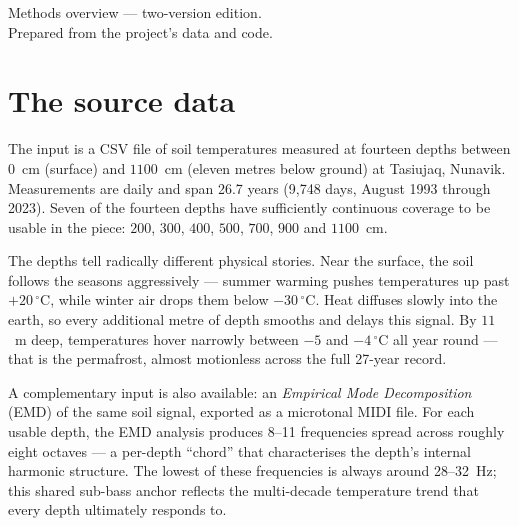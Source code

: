 \documentclass[11pt, a4paper]{article}
\begin{document}
\vfill
\begin{flushleft}
  {\sffamily\footnotesize\color{footergray}
  Methods overview --- two-version edition.\\
  Prepared from the project's data and code.}
\end{flushleft}

\clearpage

\thispagestyle{cover}
\vspace*{1em}
\renewcommand{\contentsname}{Contents}
\tableofcontents
\vfill
\clearpage

\setcounter{page}{1}

\section{The source data}

The input is a CSV file of soil temperatures measured at fourteen depths
between $0$~cm (surface) and $1100$~cm (eleven metres below ground) at
Tasiujaq, Nunavik. Measurements are daily and span 26.7 years (9{,}748 days,
August 1993 through 2023). Seven of the fourteen depths have sufficiently
continuous coverage to be usable in the piece: $200$, $300$, $400$, $500$,
$700$, $900$ and $1100$~cm.

The depths tell radically different physical stories. Near the surface, the
soil follows the seasons aggressively --- summer warming pushes temperatures
up past $+20\,^{\circ}\mathrm{C}$, while winter air drops them below
$-30\,^{\circ}\mathrm{C}$. Heat diffuses slowly into the earth, so every
additional metre of depth smooths and delays this signal. By $11$~m deep,
temperatures hover narrowly between $-5$ and $-4\,^{\circ}\mathrm{C}$ all
year round --- that is the permafrost, almost motionless across the full
27-year record.

A complementary input is also available: an \emph{Empirical Mode
Decomposition} (EMD) of the same soil signal, exported as a microtonal MIDI
file. For each usable depth, the EMD analysis produces 8--11 frequencies
spread across roughly eight octaves --- a per-depth ``chord'' that
characterises the depth's internal harmonic structure. The lowest of these
frequencies is always around 28--32~Hz; this shared sub-bass anchor reflects
the multi-decade temperature trend that every depth ultimately responds to.
\end{document}
